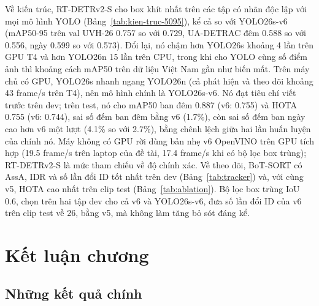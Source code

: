 Về kiến trúc, RT-DETRv2-S cho box khít nhất trên các tập có nhãn độc lập với mọi mô hình YOLO
(Bảng~\ref{tab:kien-truc-5095}), kể cả so với YOLO26s-v6 (mAP50-95 trên val UVH-26 0.757 so với 0.729, UA-DETRAC đêm
0.588 so với 0.556, ngày 0.599 so với 0.573). Đổi lại, nó chậm hơn YOLO26s khoảng 4 lần trên GPU T4 và hơn YOLO26n 15
lần trên CPU, trong khi cho YOLO cùng số điểm ảnh thì khoảng cách mAP50 trên dữ liệu Việt Nam gần như biến mất. Trên
máy chủ có GPU, YOLO26s nhanh ngang YOLO26n (cả phát hiện và theo dõi khoảng 43 frame/s trên T4), nên mô hình chính là
YOLO26s-v6. Nó đạt tiêu chí viết trước trên dev; trên test, nó cho mAP50 ban đêm 0.887 (v6: 0.755) và HOTA 0.755 (v6:
0.744), sai số đếm ban đêm bằng v6 (1.7\%), còn sai số đếm ban ngày cao hơn v6 một lượt (4.1\% so với 2.7\%), bằng
chênh lệch giữa hai lần huấn luyện của chính nó. Máy không có GPU rời dùng bản nhẹ v6 OpenVINO trên GPU tích hợp (19.5
frame/s trên laptop của đề tài, 17.4 frame/s khi có bộ lọc box trùng); RT-DETRv2-S là mức tham chiếu về độ chính xác.
Về theo dõi, BoT-SORT có AssA, IDR và số lần đổi ID tốt nhất trên dev (Bảng~\ref{tab:tracker}) và, với cùng v5, HOTA
cao nhất trên clip test (Bảng~\ref{tab:ablation}). Bộ lọc box trùng IoU 0.6, chọn trên hai tập dev cho cả v6 và
YOLO26s-v6, đưa số lần đổi ID của v6 trên clip test về 26, bằng v5, mà không làm tăng bỏ sót đáng kể.

\section{Kết luận chương}

\subsection{Những kết quả chính}

